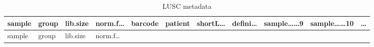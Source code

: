 \documentclass[
]{article}
\begin{document}
\begin{longtable}[]{@{}lllllllllll@{}}
\caption{\label{tab:LUSC-metadata}LUSC metadata}\tabularnewline
\toprule
\begin{minipage}[b]{0.07\columnwidth}\raggedright
sample\strut
\end{minipage} & \begin{minipage}[b]{0.04\columnwidth}\raggedright
group\strut
\end{minipage} & \begin{minipage}[b]{0.06\columnwidth}\raggedright
lib.size\strut
\end{minipage} & \begin{minipage}[b]{0.07\columnwidth}\raggedright
norm.f\ldots{}\strut
\end{minipage} & \begin{minipage}[b]{0.07\columnwidth}\raggedright
barcode\strut
\end{minipage} & \begin{minipage}[b]{0.07\columnwidth}\raggedright
patient\strut
\end{minipage} & \begin{minipage}[b]{0.07\columnwidth}\raggedright
shortL\ldots{}\strut
\end{minipage} & \begin{minipage}[b]{0.07\columnwidth}\raggedright
defini\ldots{}\strut
\end{minipage} & \begin{minipage}[b]{0.09\columnwidth}\raggedright
sample\ldots\ldots9\strut
\end{minipage} & \begin{minipage}[b]{0.10\columnwidth}\raggedright
sample\ldots\ldots10\strut
\end{minipage} & \begin{minipage}[b]{0.03\columnwidth}\raggedright
\ldots{}\strut
\end{minipage}\tabularnewline
\midrule
\endfirsthead
\toprule
\begin{minipage}[b]{0.07\columnwidth}\raggedright
sample\strut
\end{minipage} & \begin{minipage}[b]{0.04\columnwidth}\raggedright
group\strut
\end{minipage} & \begin{minipage}[b]{0.06\columnwidth}\raggedright
lib.size\strut
\end{minipage} & \begin{minipage}[b]{0.07\columnwidth}\raggedright
norm.f\ldots{}\strut

\end{minipage}
\end{longtable}
\end{document}
